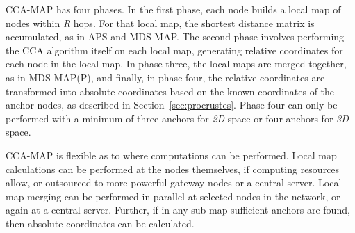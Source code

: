 CCA-MAP has four phases.  In the first phase, each node builds a local map of nodes within \emph{R} hops.  For that local map, the shortest distance matrix is accumulated, as in APS and MDS-MAP.  The second phase involves performing the CCA algorithm itself on each local map, generating relative coordinates for each node in the local map.  In phase three, the local maps are merged together, as in MDS-MAP(P), and finally, in phase four, the relative coordinates are transformed into absolute coordinates based on the known coordinates of the anchor nodes, as described in Section~\ref{sec:procrustes}.  Phase four can only be performed with a minimum of three anchors for \emph{2D} space or four anchors for \emph{3D} space.  

CCA-MAP is flexible as to where computations can be performed. Local map calculations can be performed at the nodes themselves, if computing resources allow, or outsourced to more powerful gateway nodes or a central server.  Local map merging can be performed in parallel at selected nodes in the network, or again at a central server.  Further, if in any sub-map sufficient anchors are found, then absolute coordinates can be calculated.

